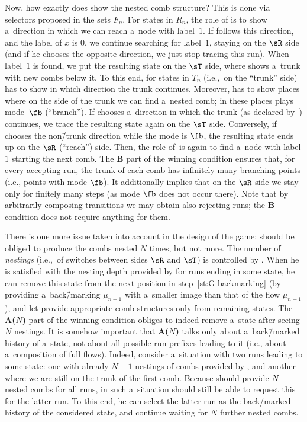 \documentclass{lmcs}
\numberwithin{equation}{section}
\numberwithin{figure}{section}
\newcommand{\itemfont}[1]{\textbf{#1}}
\begin{document}
Now, how exactly does \eve show the nested comb structure?
This is done via selectors proposed in the sets $F_n$.
For states in $R_n$, the role of \eve is to show a~direction in which we can reach a~node with label~$1$.
If \adam follows this direction, and the label of $x$ is $0$, we continue searching for label~$1$, staying on the $\sR$ side
(and if he chooses the opposite direction, we just stop tracing this run).
When label~$1$ is found, we put the resulting state on the $\sT$ side, where \eve shows a~trunk with new combs below it.
To this end, for states in $T_n$ (i.e.,~on the ``trunk'' side) \eve has to show in which direction the trunk continues.
Moreover, \eve has to show places where on the side of the trunk we can find a~nested comb; in these places \eve plays mode~$\fb$ (``branch'').
If \adam chooses a~direction in which the trunk (as declared by~\eve) continues, we trace the resulting state again on the $\sT$ side.
Conversely, if \adam chooses the non\=/trunk direction while the mode is $\fb$, the resulting state ends up on the $\sR$ (``reach'') side.
Then, the role of~\eve is again to find a~node with label $1$ starting the next comb.
The \itemfont{B} part of the winning condition ensures that, for every accepting run, the trunk of each comb has infinitely many branching points (i.e., points with mode $\fb$).
It additionally implies that
on the $\sR$ side we stay only for finitely many steps (as mode $\fb$ does not occur there).
Note that by arbitrarily composing transitions we may obtain also rejecting runs; the \itemfont{B} condition does not require anything for them.

There is one more issue taken into account in the design of the game: \eve should be obliged to produce the combs nested $N$ times, but not more.
The number of \emph{nestings} (i.e.,~of switches between sides $\sR$ and $\sT$) is controlled by \adam.
When he is satisfied with the nesting depth provided by \eve for runs ending in some state,
he can remove this state from the next position in step~\ref{st:G-backmarking} (by providing a~back\=/marking $\bar\mu_{n+1}$ with a~smaller image than that of the flow $\mu_{n+1}$),
and let \eve provide appropriate comb structures only from remaining states.
The \itemfont{A($N$)} part of the winning condition obliges \adam to indeed remove a~state after seeing $N$ nestings.
It is somehow important that \itemfont{A($N$)} talks only about a~back\=/marked history of a~state, not about all possible run prefixes leading to it (i.e., about a~composition of full flows).
Indeed, consider a~situation with two runs leading to some state:
one with already $N{-}1$ nestings of combs provided by \eve, and another where we are still on the trunk of the first comb.
Because \eve should provide $N$ nested combs for all runs, in such a~situation \adam should still be able to request this for the latter run.
To this end, he can select the latter run as the back\=/marked history of the considered state, and continue waiting for $N$ further nested combs.
\end{document}
